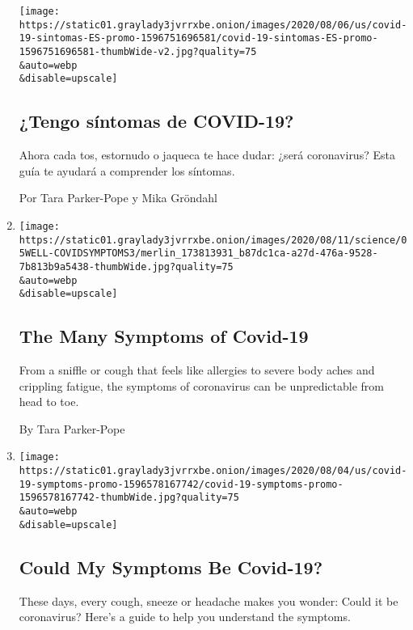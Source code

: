 \begin{enumerate}
  \texttt{[image: https://static01.graylady3jvrrxbe.onion/images/2020/08/06/us/covid-19-sintomas-ES-promo-1596751696581/covid-19-sintomas-ES-promo-1596751696581-thumbWide-v2.jpg?quality=75\\\&auto=webp\\\&disable=upscale]}

  \hypertarget{tengo-suxedntomas-de-covid-19-1}{%
  \subsection{¿Tengo síntomas de
  COVID-19?}\label{tengo-suxedntomas-de-covid-19-1}}

  Ahora cada tos, estornudo o jaqueca te hace dudar: ¿será coronavirus?
  Esta guía te ayudará a comprender los síntomas.

  Por Tara Parker-Pope y Mika Gröndahl
\item
  \href{/2020/08/05/well/live/coronavirus-covid-symptoms.html}{}

  \texttt{[image: https://static01.graylady3jvrrxbe.onion/images/2020/08/11/science/05WELL-COVIDSYMPTOMS3/merlin\_173813931\_b87dc1ca-a27d-476a-9528-7b813b9a5438-thumbWide.jpg?quality=75\\\&auto=webp\\\&disable=upscale]}

  \hypertarget{the-many-symptoms-of-covid-19}{%
  \subsection{The Many Symptoms of
  Covid-19}\label{the-many-symptoms-of-covid-19}}

  From a sniffle or cough that feels like allergies to severe body aches
  and crippling fatigue, the symptoms of coronavirus can be
  unpredictable from head to toe.

  By Tara Parker-Pope
\item
  \href{/interactive/2020/08/05/well/covid-19-symptoms.html}{}

  \texttt{[image: https://static01.graylady3jvrrxbe.onion/images/2020/08/04/us/covid-19-symptoms-promo-1596578167742/covid-19-symptoms-promo-1596578167742-thumbWide.jpg?quality=75\\\&auto=webp\\\&disable=upscale]}

  \hypertarget{could-my-symptoms-be-covid-19}{%
  \subsection{Could My Symptoms Be
  Covid-19?}\label{could-my-symptoms-be-covid-19}}

  These days, every cough, sneeze or headache makes you wonder: Could it
  be coronavirus? Here's a guide to help you understand the symptoms.


\end{enumerate}
